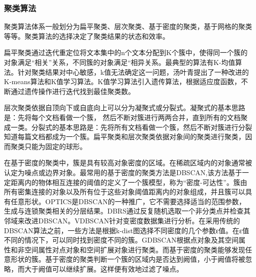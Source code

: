 \subsubsection{聚类算法}
聚类算法体系一般划分为扁平聚类、层次聚类、基于密度的聚类，基于网格的聚类等等\cite{DBLP:journals/coling/Vechtomova09}。聚类算法的选择决定了聚类结果的状态和效率。

扁平聚类通过迭代重定位将文本集中的n个文本分配到K个簇中，使得同一个簇的对象满足“相关”关系，不同簇的对象满足“相异关系。最典型的算法有K-均值算法。针对聚类结果对中心敏感，k值无法确定这一问题，汤叶青\cite{DBLP:tyq}提出了一种改进的K-means算法和K值学习算法。K值学习算法引入遗传算法，根据适应度函数，不断通过遗传操作进行迭代找到最佳聚类数。

层次聚类依据自顶向下或自底向上可以分为凝聚式或分裂式。凝聚式的基本思路是：先将每个文档看做一个簇， 然后不断对簇进行两两合并，直到所有的文档聚成一类。分裂式的基本思路是：先将所有文档看做一个簇，然后不断对簇进行分裂知道每篇文档都成为一个簇。扁平聚类和层次聚类依据对象间的聚类进行聚类，因而聚类只能为固定的球形。

在基于密度的聚类中，簇是具有较高对象密度的区域。在稀疏区域内的对象通常被认定为噪点或边界对象。最常用的基于密度的聚类方法是DBSCAN\cite{DBLP:conf/kdd/EsterKSX96 },该方法基于一定距离内的物体相互连接的阈值的定义了一个簇模型，称为“密度-可达性”。簇由所有密集连接的对象以及所有位于这些对象阈值距离内的对象组成，并且簇可以具有任意形状。OPTICS\cite{DBLP:conf/sigmod/AnkerstBKS99 }是DBSCAN的一种推广，它不需要选择适当的范围参数，生成与连锁聚类相关的分层结果。DBRS\cite{DBLP:conf/pakdd/WangH03}通过反复随机选取一个非分类点并检查其邻域来改进DBSCAN。VDBSCAN\cite{DBLP:conf/icde/ZhangOT10}针对变密度数据集进行分析。在采用传统的DBSCAN算法之前，一些方法是根据k-dist图选择不同密度的几个参数ε值。在ε值不同的情况下，可以同时找到密度不同的簇。GDBSCAN根据点对象及其空间属性和非空间属性对点对象和空间扩展对象进行聚类。而基于密度的聚类能够发现任意形状的簇。基于密度的聚类判断一个簇的区域内是否达到阙值，小于阙值将被忽略，而大于阙值可以继续扩展。这样便有效地过滤了噪点。
